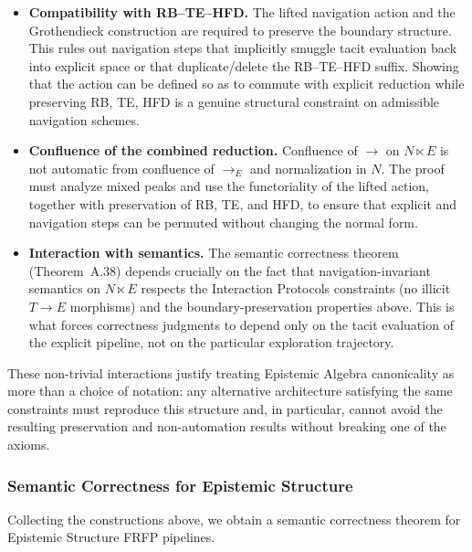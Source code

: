 \begin{itemize}
  \item \textbf{Compatibility with RB--TE--HFD.} The lifted navigation action and the
  Grothendieck construction are required to preserve the boundary structure. This rules out
  navigation steps that implicitly smuggle tacit evaluation back into explicit space or that
  duplicate/delete the RB--TE--HFD suffix. Showing that the action can be defined so as to
  commute with explicit reduction while preserving RB, TE, HFD is a genuine structural
  constraint on admissible navigation schemes.
  \item \textbf{Confluence of the combined reduction.} Confluence of $\to$ on $N \ltimes E$ is not
  automatic from confluence of $\to_E$ and normalization in $N$. The proof must analyze
  mixed peaks and use the functoriality of the lifted action, together with preservation of
  RB, TE, and HFD, to ensure that explicit and navigation steps can be permuted without
  changing the normal form.
  \item \textbf{Interaction with semantics.} The semantic correctness theorem (Theorem~A.38)
  depends crucially on the fact that navigation-invariant semantics on $N \ltimes E$ respects
  the Interaction Protocols constraints (no illicit $T \to E$ morphisms) and the boundary-preservation
  properties above. This is what forces correctness judgments to depend only on the tacit
  evaluation of the explicit pipeline, not on the particular exploration trajectory.
\end{itemize}

These non-trivial interactions justify treating Epistemic Algebra canonicality as more than a choice of
notation: any alternative architecture satisfying the same constraints must reproduce this
structure and, in particular, cannot avoid the resulting preservation and non-automation results
without breaking one of the axioms.

\subsubsection{Semantic Correctness for Epistemic Structure}

Collecting the constructions above, we obtain a semantic correctness
theorem for Epistemic Structure FRFP pipelines.


